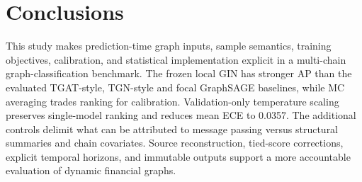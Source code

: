 \documentclass[applsci,article,submit,pdftex,moreauthors]{Definitions/mdpi}
\begin{document}
\section{Conclusions}
This study makes prediction-time graph inputs, sample semantics, training objectives, calibration, and statistical implementation explicit in a multi-chain graph-classification benchmark. The frozen local GIN has stronger AP than the evaluated TGAT-style, TGN-style and focal GraphSAGE baselines, while MC averaging trades ranking for calibration. Validation-only temperature scaling preserves single-model ranking and reduces mean ECE to 0.0357. The additional controls delimit what can be attributed to message passing versus structural summaries and chain covariates. Source reconstruction, tied-score corrections, explicit temporal horizons, and immutable outputs support a more accountable evaluation of dynamic financial graphs.
\end{document}
